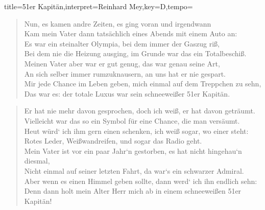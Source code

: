 \documentclass{leadsheet}
\begin{document}
\begin{song}[transpose=5]{title={51er Kapitän},interpret={Reinhard Mey},key={D},tempo={}}
\begin{verse}
Nun, es kamen andre Zeiten, es ging voran und irgendwann \\
Kam mein Vater dann tatsächlich eines Abends mit einem Auto an: \\
Es war ein steinalter Olympia, bei dem immer der Gaszug riß, \\
Bei dem nie die Heizung ausging, im Grunde war das ein Totalbeschiß. \\
Meinen Vater aber war er gut genug, das war genau seine Art, \\
An sich selber immer rumzuknausern, an uns hat er nie gespart. \\
Mir jede Chance im Leben geben, mich einmal auf dem Treppchen zu sehn, \\
Das war es: der totale Luxus war sein schneeweißer 51er Kapitän. \\
\end{verse}

\begin{verse}
Er hat nie mehr davon gesprochen, doch ich weiß, er hat davon geträumt. \\
Vielleicht war das so ein Symbol für eine Chance, die man versäumt. \\
Heut würd‘ ich ihm gern einen schenken, ich weiß sogar, wo einer steht: \\
Rotes Leder, Weißwandreifen, und sogar das Radio geht. \\
Mein Vater ist vor ein paar Jahr‘n gestorben, es hat nicht hingehau‘n diesmal, \\
Nicht einmal auf seiner letzten Fahrt, da war‘s ein schwarzer Admiral. \\
Aber wenn es einen Himmel geben sollte, dann werd‘ ich ihn endlich sehn: \\
Denn dann holt mein Alter Herr mich ab in einem schneeweißen 51er Kapitän! \\
\end{verse}

\end{song}
\end{document}
